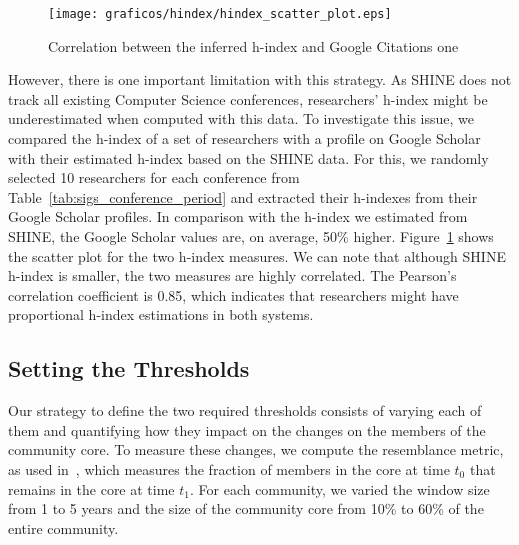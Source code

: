 \begin{figure}[!htb]
\centering
\texttt{[image: graficos/hindex/hindex\_scatter\_plot.eps]}
\caption{Correlation between the inferred h-index and Google Citations one}
\vspace{-0.2cm}
\label{fig:hindex_scatter_plot}
\vspace{-0.2cm}
\end{figure}

However, there is one important limitation with this strategy.  As SHINE does not track all existing Computer Science conferences, researchers' h-index might be underestimated when computed
with this data. To investigate this issue, we compared the h-index of a set of researchers with a profile on Google Scholar with their estimated h-index based on the SHINE data. For this, we
randomly selected 10 researchers for each conference from Table~\ref{tab:sigs_conference_period} and extracted their h-indexes from their Google Scholar profiles.  In comparison
with the h-index we estimated from SHINE, the Google Scholar values are, on average, 50\% higher. Figure~\ref{fig:hindex_scatter_plot} shows the scatter plot for the two h-index
measures. We can note that although SHINE h-index is smaller, the two measures are highly correlated. The Pearson's correlation coefficient is 0.85, which indicates that researchers
might have proportional h-index estimations in both systems. 

\subsection{Setting the Thresholds}
\label{sub:thresholds}

Our strategy to define the two required thresholds consists of varying each of them and quantifying how they impact on the changes on the members of the community core. To measure these
changes, we compute the resemblance metric, as used in~\cite{Viswanath:2009}, which measures the fraction of members in the core at time $t_0$ that remains in the core at time $t_1$. 
For each community, we varied the window size from 1 to 5 years and the size of the community core from 10\% to 60\% of the entire community.

